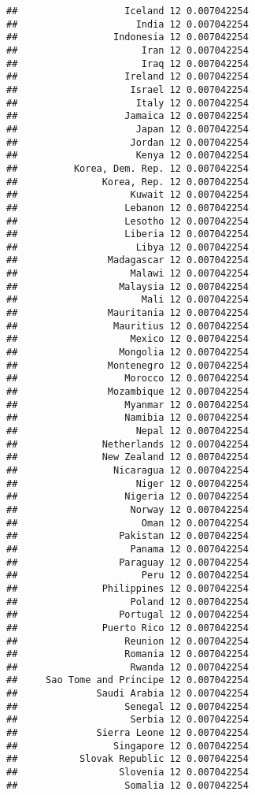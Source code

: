 \documentclass[
]{book}
\begin{document}
\begin{verbatim}
##                   Iceland 12 0.007042254
##                     India 12 0.007042254
##                 Indonesia 12 0.007042254
##                      Iran 12 0.007042254
##                      Iraq 12 0.007042254
##                   Ireland 12 0.007042254
##                    Israel 12 0.007042254
##                     Italy 12 0.007042254
##                   Jamaica 12 0.007042254
##                     Japan 12 0.007042254
##                    Jordan 12 0.007042254
##                     Kenya 12 0.007042254
##          Korea, Dem. Rep. 12 0.007042254
##               Korea, Rep. 12 0.007042254
##                    Kuwait 12 0.007042254
##                   Lebanon 12 0.007042254
##                   Lesotho 12 0.007042254
##                   Liberia 12 0.007042254
##                     Libya 12 0.007042254
##                Madagascar 12 0.007042254
##                    Malawi 12 0.007042254
##                  Malaysia 12 0.007042254
##                      Mali 12 0.007042254
##                Mauritania 12 0.007042254
##                 Mauritius 12 0.007042254
##                    Mexico 12 0.007042254
##                  Mongolia 12 0.007042254
##                Montenegro 12 0.007042254
##                   Morocco 12 0.007042254
##                Mozambique 12 0.007042254
##                   Myanmar 12 0.007042254
##                   Namibia 12 0.007042254
##                     Nepal 12 0.007042254
##               Netherlands 12 0.007042254
##               New Zealand 12 0.007042254
##                 Nicaragua 12 0.007042254
##                     Niger 12 0.007042254
##                   Nigeria 12 0.007042254
##                    Norway 12 0.007042254
##                      Oman 12 0.007042254
##                  Pakistan 12 0.007042254
##                    Panama 12 0.007042254
##                  Paraguay 12 0.007042254
##                      Peru 12 0.007042254
##               Philippines 12 0.007042254
##                    Poland 12 0.007042254
##                  Portugal 12 0.007042254
##               Puerto Rico 12 0.007042254
##                   Reunion 12 0.007042254
##                   Romania 12 0.007042254
##                    Rwanda 12 0.007042254
##     Sao Tome and Principe 12 0.007042254
##              Saudi Arabia 12 0.007042254
##                   Senegal 12 0.007042254
##                    Serbia 12 0.007042254
##              Sierra Leone 12 0.007042254
##                 Singapore 12 0.007042254
##           Slovak Republic 12 0.007042254
##                  Slovenia 12 0.007042254
##                   Somalia 12 0.007042254

\end{verbatim}
\end{document}
